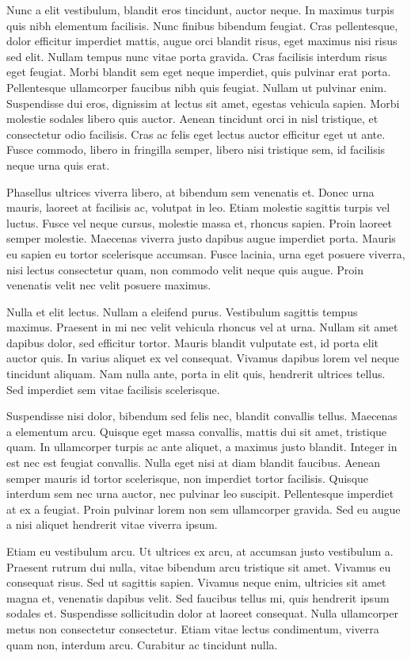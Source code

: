 Nunc a elit vestibulum, blandit eros tincidunt, auctor neque. In maximus turpis quis nibh elementum facilisis. Nunc finibus bibendum feugiat. Cras pellentesque, dolor efficitur imperdiet mattis, augue orci blandit risus, eget maximus nisi risus sed elit. Nullam tempus nunc vitae porta gravida. Cras facilisis interdum risus eget feugiat. Morbi blandit sem eget neque imperdiet, quis pulvinar erat porta. Pellentesque ullamcorper faucibus nibh quis feugiat. Nullam ut pulvinar enim. Suspendisse dui eros, dignissim at lectus sit amet, egestas vehicula sapien. Morbi molestie sodales libero quis auctor. Aenean tincidunt orci in nisl tristique, et consectetur odio facilisis. Cras ac felis eget lectus auctor efficitur eget ut ante. Fusce commodo, libero in fringilla semper, libero nisi tristique sem, id facilisis neque urna quis erat.

Phasellus ultrices viverra libero, at bibendum sem venenatis et. Donec urna mauris, laoreet at facilisis ac, volutpat in leo. Etiam molestie sagittis turpis vel luctus. Fusce vel neque cursus, molestie massa et, rhoncus sapien. Proin laoreet semper molestie. Maecenas viverra justo dapibus augue imperdiet porta. Mauris eu sapien eu tortor scelerisque accumsan. Fusce lacinia, urna eget posuere viverra, nisi lectus consectetur quam, non commodo velit neque quis augue. Proin venenatis velit nec velit posuere maximus.

Nulla et elit lectus. Nullam a eleifend purus. Vestibulum sagittis tempus maximus. Praesent in mi nec velit vehicula rhoncus vel at urna. Nullam sit amet dapibus dolor, sed efficitur tortor. Mauris blandit vulputate est, id porta elit auctor quis. In varius aliquet ex vel consequat. Vivamus dapibus lorem vel neque tincidunt aliquam. Nam nulla ante, porta in elit quis, hendrerit ultrices tellus. Sed imperdiet sem vitae facilisis scelerisque.

Suspendisse nisi dolor, bibendum sed felis nec, blandit convallis tellus. Maecenas a elementum arcu. Quisque eget massa convallis, mattis dui sit amet, tristique quam. In ullamcorper turpis ac ante aliquet, a maximus justo blandit. Integer in est nec est feugiat convallis. Nulla eget nisi at diam blandit faucibus. Aenean semper mauris id tortor scelerisque, non imperdiet tortor facilisis. Quisque interdum sem nec urna auctor, nec pulvinar leo suscipit. Pellentesque imperdiet at ex a feugiat. Proin pulvinar lorem non sem ullamcorper gravida. Sed eu augue a nisi aliquet hendrerit vitae viverra ipsum.

Etiam eu vestibulum arcu. Ut ultrices ex arcu, at accumsan justo vestibulum a. Praesent rutrum dui nulla, vitae bibendum arcu tristique sit amet. Vivamus eu consequat risus. Sed ut sagittis sapien. Vivamus neque enim, ultricies sit amet magna et, venenatis dapibus velit. Sed faucibus tellus mi, quis hendrerit ipsum sodales et. Suspendisse sollicitudin dolor at laoreet consequat. Nulla ullamcorper metus non consectetur consectetur. Etiam vitae lectus condimentum, viverra quam non, interdum arcu. Curabitur ac tincidunt nulla.


